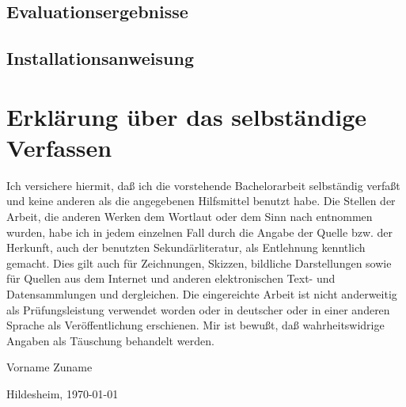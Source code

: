 \documentclass[11pt,        %
  english,ngerman,          %
  paper=a4,                 %
  captions=tablesignature,  %
  listof=numbered,          %
  bibliography=totoc,       %
  headings=small,           %
  headinclude=false,        %
  footinclude=false,        %
  parskip=half-,            %
  oneside,                  %
  BCOR=15mm,                 %
  DIV=12                    %
  ]{scrbook}                %
\begin{document}
\clearpage
\section{Evaluationsergebnisse}\label{sec:appendix_eval}


\clearpage
\section{Installationsanweisung}\label{sec:appendix_install}
% 

\chapter*{Erklärung über das selbständige Verfassen}
\thispagestyle{empty}

  {
    Ich versichere hiermit, daß ich die vorstehende
    Bachelorarbeit
    selbständig verfaßt und keine anderen als die angegebenen Hilfsmittel
    benutzt habe. Die Stellen der Arbeit, die anderen Werken dem Wortlaut
    oder dem Sinn nach entnommen wurden, habe ich in jedem einzelnen Fall
    durch die Angabe der Quelle bzw. der Herkunft, auch der benutzten
    Sekundärliteratur, als Entlehnung kenntlich gemacht. Dies gilt auch für
    Zeichnungen, Skizzen, bildliche Darstellungen sowie für Quellen aus dem 
    Internet und anderen elektronischen Text- und Datensammlungen und
    dergleichen. Die eingereichte Arbeit ist nicht anderweitig als
    Prüfungsleistung verwendet worden oder in deutscher oder in einer anderen 
    Sprache als Veröffentlichung erschienen. Mir ist bewußt, daß
    wahrheitswidrige Angaben als Täuschung behandelt werden.
  }


\vspace*{4cm}

Vorname Zuname

\vspace*{1cm}

Hildesheim, \today
\end{document}
